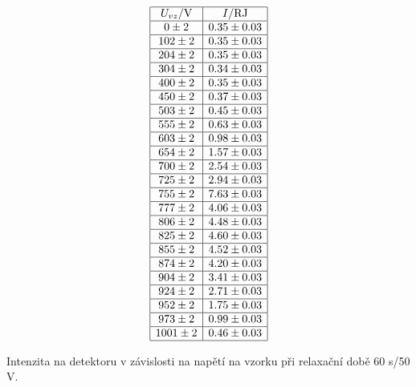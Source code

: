 \documentclass[a4paper,12pt]{article}
\begin{document}
\begin{table}
$$
\begin{array}{|c|c|}
\hline
U_{vz}/\mbox{V}&	I/\mbox{RJ} \\ \hline
0\pm 2&0.35\pm 0.03 \\ \hline 
102\pm 2&0.35\pm 0.03 \\ \hline 
204\pm 2&0.35\pm 0.03 \\ \hline 
304\pm 2&0.34\pm 0.03 \\ \hline 
400\pm 2&0.35\pm 0.03 \\ \hline 
450\pm 2&0.37\pm 0.03 \\ \hline 
503\pm 2&0.45\pm 0.03 \\ \hline 
555\pm 2&0.63\pm 0.03 \\ \hline 
603\pm 2&0.98\pm 0.03 \\ \hline 
654\pm 2&1.57\pm 0.03 \\ \hline 
700\pm 2&2.54\pm 0.03 \\ \hline 
725\pm 2&2.94\pm 0.03 \\ \hline 
755\pm 2&7.63\pm 0.03 \\ \hline 
777\pm 2&4.06\pm 0.03 \\ \hline 
806\pm 2&4.48\pm 0.03 \\ \hline 
825\pm 2&4.60\pm 0.03 \\ \hline 
855\pm 2&4.52\pm 0.03 \\ \hline 
874\pm 2&4.20\pm 0.03 \\ \hline 
904\pm 2&3.41\pm 0.03 \\ \hline 
924\pm 2&2.71\pm 0.03 \\ \hline
952\pm 2&1.75\pm 0.03 \\ \hline 
973\pm 2&0.99\pm 0.03 \\ \hline 
1001\pm 2&0.46\pm 0.03 \\ \hline 
\end{array}
$$
\caption{Intenzita na detektoru v závislosti na napětí na vzorku při relaxační době 60 s/50 V.}
\label{TM60}
\end{table}
\end{document}
